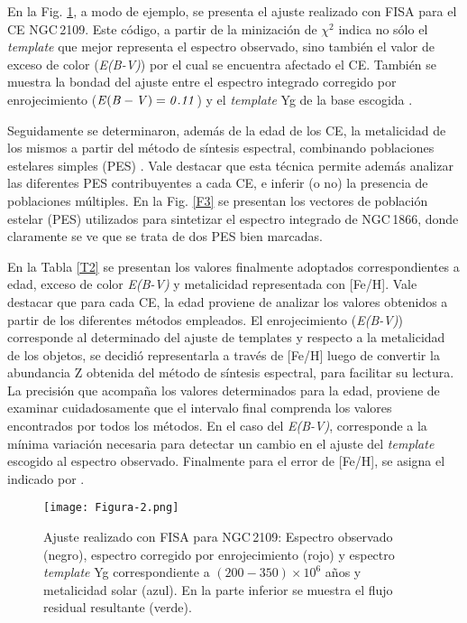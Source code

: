 \documentclass[baaa]{baaa}
\begin{document}
En la Fig. \ref{F2}, a modo de ejemplo, se presenta el ajuste realizado con FISA \citep{BL2012} para el CE NGC\,2109. Este código, a partir de la minización de $\chi^2$ indica no sólo el {\it template} que mejor representa el espectro observado, sino también el valor de exceso de color ({\it E(B-V)}) por el cual se encuentra afectado el CE. También se muestra la bondad del ajuste  entre el espectro integrado corregido por enrojecimiento ($\it E(B-V)=0.11$) y el {\it template} Yg de la base escogida \citep{Piatti2002}.


Seguidamente se determinaron, además de la edad de los CE, la metalicidad de los mismos a partir del método de síntesis espectral, combinando poblaciones estelares simples (PES) \citep{Ahumada2019,SR2023}. Vale destacar que esta técnica permite además analizar las diferentes PES contribuyentes a cada CE, e inferir (o no) la presencia de poblaciones múltiples. En la Fig. \ref{F3} se presentan los vectores de población estelar (PES) utilizados para sintetizar el espectro integrado de NGC\,1866, donde claramente se ve que se trata de dos PES bien marcadas.

En la Tabla \ref{T2} se presentan los valores finalmente adoptados correspondientes a edad, exceso de color {\it E(B-V)} y metalicidad representada con [Fe/H]. Vale destacar que para cada CE, la edad proviene de analizar los valores obtenidos a partir de los diferentes métodos empleados. El enrojecimiento ({\it E(B-V)}) corresponde al determinado del ajuste de templates y respecto a la metalicidad de los objetos, se decidió representarla a través de [Fe/H] luego de convertir la abundancia Z obtenida del método de síntesis espectral, para facilitar su lectura.  La precisión que acompaña los valores determinados para la edad, proviene de examinar cuidadosamente que el intervalo final comprenda los valores encontrados por todos los métodos. En el caso del {\it E(B-V)}, corresponde a la mínima variación necesaria para detectar un cambio en el ajuste del {\it template} escogido al espectro observado. Finalmente para el error de [Fe/H], se asigna el indicado por \cite{Gonzalez2010}.


\begin{figure}
\centering
\texttt{[image: Figura-2.png]}
\caption{Ajuste realizado con FISA para NGC\,2109: Espectro observado (negro), espectro corregido por enrojecimiento (rojo) y espectro {\em{template}} Yg correspondiente a $(200-350)\times10^{6}$ años y metalicidad solar (azul). En la parte inferior se muestra el flujo residual resultante (verde).}
\label{F2}
\end{figure}
\end{document}
